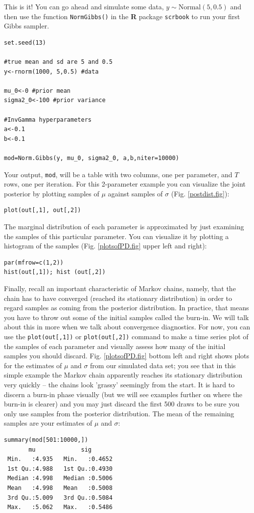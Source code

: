 This is it! You can go ahead and simulate some data, $y \sim \mbox{Normal}(5, 0.5)$ and then use the function \mbox{\tt NormGibbs()} in the {\bf R} package \mbox{\tt scrbook} to run your first Gibbs sampler. 

\begin{verbatim}
set.seed(13)

#true mean and sd are 5 and 0.5
y<-rnorm(1000, 5,0.5) #data

mu_0<-0 #prior mean
sigma2_0<-100 #prior variance 

#InvGamma hyperparameters
a<-0.1
b<-0.1 

mod=Norm.Gibbs(y, mu_0, sigma2_0, a,b,niter=10000)
\end{verbatim}

Your output, \verb#mod#, will be a table with two columns, one per
parameter, and $T$ rows, one per iteration. For this 2-parameter example
you can visualize the joint posterior by plotting samples of $\mu$
against samples of $\sigma$ (Fig. \ref{postdist.fig}):
\begin{verbatim}
plot(out[,1], out[,2])
\end{verbatim}
The marginal distribution of each parameter is approximated by just
examining the samples of this particular parameter. You can visualize
it by plotting a histogram of the samples (Fig. \ref{plotsofPD.fig} upper left and right):
\begin{verbatim}
par(mfrow=c(1,2))
hist(out[,1]); hist (out[,2])
\end{verbatim}

Finally, recall an important characteristic of Markov chains, namely,
that the chain has to have converged (reached its stationary
distribution) in order to regard samples as coming from the posterior distribution. In
practice, that means you have to throw out some of the initial samples
called the burn-in. We will talk about this in more when we talk
about convergence diagnostics. For now, you can use the
\verb#plot(out[,1])# or \verb#plot(out[,2])# command to make a time
series plot of the samples of each parameter and visually assess how
many of the initial samples you should discard. Fig. \ref{plotsofPD.fig} bottom left and right shows
plots for the estimates of $\mu$ and $\sigma$ from our simulated data set;
you see that in this simple example the Markov chain apparently
reaches its stationary distribution very quickly -- the chains look
'grassy' seemingly from the start. It is hard to discern a burn-in
phase visually (but we will see examples further on where the burn-in
is clearer) and you may just discard the first 500 draws to be sure
you only use samples from the posterior distribution. The mean of the
remaining samples are your estimates of $\mu$ and $\sigma$:
\begin{verbatim}
summary(mod[501:10000,])
       mu             sig        
 Min.   :4.935   Min.   :0.4652  
 1st Qu.:4.988   1st Qu.:0.4930  
 Median :4.998   Median :0.5006  
 Mean   :4.998   Mean   :0.5008  
 3rd Qu.:5.009   3rd Qu.:0.5084  
 Max.   :5.062   Max.   :0.5486  
\end{verbatim}

